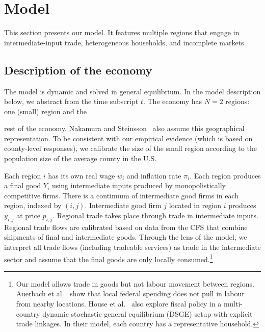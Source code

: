 \documentclass[\latexroot/\projectname]{subfiles}
\begin{document}
\whenintegrated{%
}

\section{Model}
\whenintegrated{\label{sec:model}} %

This section presents our model. It features multiple regions that engage in intermediate-input trade, heterogeneous households, and incomplete markets.

\subsection{Description of the economy}
The model is dynamic and solved in general equilibrium. In the model description below, we abstract from the time subscript $t$. The economy has $N=2$ regions: one (small) region and the



rest of the economy. Nakamura and Steinsson~\cite{Nakamura2011-dw} also assume this geographical representation. To be consistent with our empirical evidence (which is based on county-level responses), we calibrate the size of the small region according to the population size of the average county in the U.S.

Each region $i$ has its own real wage $w_{i}$ and inflation rate $\pi_{i}$. Each region produces a final good $Y_{i}$ using intermediate inputs produced by monopolistically competitive firms. There is a continuum of intermediate good firms in each region, indexed by $(i, j)$. Intermediate good firm $j$ located in region $i$ produces $y_{i, j}$ at price $p_{i, j}$. Regional trade takes place through trade in intermediate inputs. Regional trade flows are calibrated based on data from the CFS that combine shipments of final and intermediate goods. Through the lens of the model, we interpret all trade flows (including tradeable services) as trade in the intermediate sector and assume that the final goods are only locally consumed.\footnote{Our model allows trade in goods but not labour movement between regions. Auerbach et al.~\cite{Auerbach2019-pi} show that local federal spending does not pull in labour from nearby locations. House et al.~\cite{House2020-ho} also explore fiscal policy in a multi-country dynamic stochastic general equilibrium (DSGE) setup with explicit trade linkages. In their model, each country has a representative household.}
\end{document}

